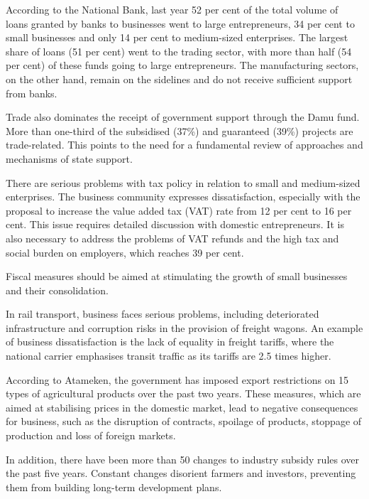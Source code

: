 \begin{multicols}{2}

According to the National Bank, last year 52 per cent of the total
volume of loans granted by banks to businesses went to large
entrepreneurs, 34 per cent to small businesses and only 14 per cent to
medium-sized enterprises. The largest share of loans (51 per cent) went
to the trading sector, with more than half (54 per cent) of these funds
going to large entrepreneurs. The manufacturing sectors, on the other
hand, remain on the sidelines and do not receive sufficient support from
banks.

Trade also dominates the receipt of government support through the Damu
fund. More than one-third of the subsidised (37\%) and guaranteed (39\%)
projects are trade-related. This points to the need for a fundamental
review of approaches and mechanisms of state support.

There are serious problems with tax policy in relation to small and
medium-sized enterprises. The business community expresses
dissatisfaction, especially with the proposal to increase the value
added tax (VAT) rate from 12 per cent to 16 per cent. This issue
requires detailed discussion with domestic entrepreneurs. It is also
necessary to address the problems of VAT refunds and the high tax and
social burden on employers, which reaches 39 per cent.

Fiscal measures should be aimed at stimulating the growth of small
businesses and their consolidation.

In rail transport, business faces serious problems, including
deteriorated infrastructure and corruption risks in the provision of
freight wagons. An example of business dissatisfaction is the lack of
equality in freight tariffs, where the national carrier emphasises
transit traffic as its tariffs are 2.5 times higher.

According to Atameken, the government has imposed export restrictions on
15 types of agricultural products over the past two years. These
measures, which are aimed at stabilising prices in the domestic market,
lead to negative consequences for business, such as the disruption of
contracts, spoilage of products, stoppage of production and loss of
foreign markets.

In addition, there have been more than 50 changes to industry subsidy
rules over the past five years. Constant changes disorient farmers and
investors, preventing them from building long-term development plans.


\end{multicols}
